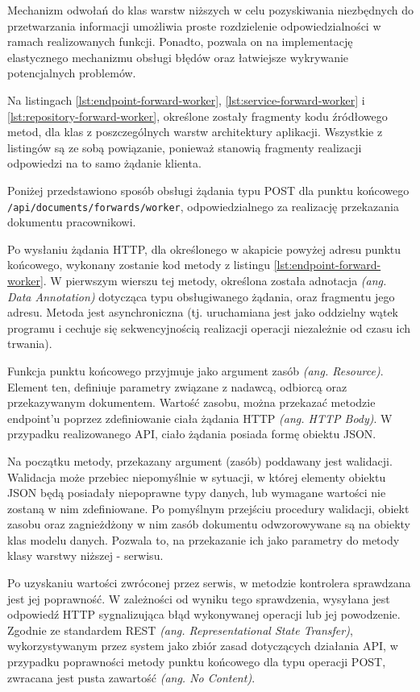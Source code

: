 Mechanizm odwołań do klas warstw niższych w celu pozyskiwania niezbędnych do przetwarzania informacji umożliwia proste rozdzielenie odpowiedzialności w ramach realizowanych funkcji. Ponadto, pozwala on na implementację elastycznego mechanizmu obsługi błędów oraz łatwiejsze wykrywanie potencjalnych problemów.

Na listingach \ref{lst:endpoint-forward-worker}, \ref{lst:service-forward-worker} i \ref{lst:repository-forward-worker}, określone zostały fragmenty kodu źródłowego metod, dla klas z poszczególnych warstw architektury aplikacji. Wszystkie z listingów są ze sobą powiązanie, ponieważ stanowią fragmenty realizacji odpowiedzi na to samo żądanie klienta.

Poniżej przedstawiono sposób obsługi żądania typu POST dla punktu końcowego \texttt{/api/documents/forwards/worker}, odpowiedzialnego za realizację przekazania dokumentu pracownikowi.

Po wysłaniu żądania HTTP, dla określonego w akapicie powyżej adresu punktu końcowego, wykonany zostanie kod metody z listingu \ref{lst:endpoint-forward-worker}. W pierwszym wierszu tej metody, określona została adnotacja \textit{(ang. Data Annotation)} dotycząca typu obsługiwanego żądania, oraz fragmentu jego adresu. Metoda jest asynchroniczna (tj. uruchamiana jest jako oddzielny wątek programu i cechuje się sekwencyjnością realizacji operacji niezależnie od czasu ich trwania).

Funkcja punktu końcowego przyjmuje jako argument zasób \textit{(ang. Resource)}. Element ten, definiuje parametry związane z nadawcą, odbiorcą oraz przekazywanym dokumentem. Wartość zasobu, można przekazać metodzie endpoint'u poprzez zdefiniowanie ciała żądania HTTP \textit{(ang. HTTP Body)}. W przypadku realizowanego API, ciało żądania posiada formę obiektu JSON.

Na początku metody, przekazany argument (zasób) poddawany jest walidacji. Walidacja może przebiec niepomyślnie w sytuacji, w której elementy obiektu JSON będą posiadały niepoprawne typy danych, lub wymagane wartości nie zostaną w nim zdefiniowane. Po pomyślnym przejściu procedury walidacji, obiekt zasobu oraz zagnieżdżony w nim zasób dokumentu odwzorowywane są na obiekty klas modelu danych. Pozwala to, na przekazanie ich jako parametry do metody klasy warstwy niższej - serwisu.

Po uzyskaniu wartości zwróconej przez serwis, w metodzie kontrolera sprawdzana jest jej poprawność. W zależności od wyniku tego sprawdzenia, wysyłana jest odpowiedź HTTP sygnalizująca błąd wykonywanej operacji lub jej powodzenie. Zgodnie ze standardem REST \textit{(ang. Representational State Transfer)}, wykorzystywanym przez system jako zbiór zasad dotyczących działania API, w przypadku poprawności metody punktu końcowego dla typu operacji POST, zwracana jest pusta zawartość \textit{(ang. No Content)}.

